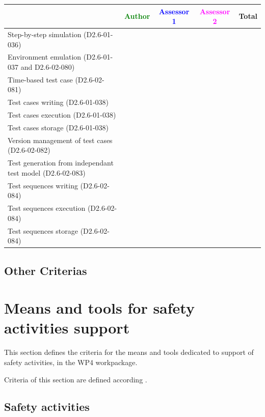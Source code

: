 \begin{tabular}{|l | c | c | c | c|}
\hline
& \textcolor{green}{Author} & \textcolor{blue}{Assessor 1} & \textcolor{magenta}{Assessor 2} & Total \\
\hline 
Step-by-step simulation (D2.6-01-036) & & & &  \\
\hline
Environment emulation (D2.6-01-037 and D2.6-02-080) & & & &  \\
\hline
Time-based test case (D2.6-02-081) & & & &  \\
\hline
Test cases writing (D2.6-01-038) & & & &  \\
\hline
Test cases execution (D2.6-01-038) & & & &  \\
\hline
Test cases storage (D2.6-01-038) & & & &  \\
\hline
Version management of test cases (D2.6-02-082) & & & &  \\
\hline
Test generation from independant test model (D2.6-02-083) & & & &  \\
\hline
Test sequences writing (D2.6-02-084) & & & &  \\
\hline
Test sequences execution (D2.6-02-084) & & & &  \\
\hline
Test sequences storage (D2.6-02-084) & & & &  \\
\hline
\end{tabular}

\subsection{Other Criterias}

\section{Means and tools for safety activities support}
\label{sec:safety}


This section defines the criteria for the means and tools dedicated to support of safety activities, in the WP4 workpackage. 

Criteria of this section are defined according \citep{D4.2.a}.

\subsection{Safety activities}

